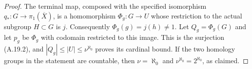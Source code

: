 \begin{proof}
The terminal map, composed with the specified isomorphism
$q_*:G\to\pi_1(\overline X)$, is a homomorphism
$\Phi_g:G\to U$ whose restriction to the actual subgroup
$H\subset G$ is $j$. Consequently
$\Phi_g(g)=j(h)\ne1$. Let $Q_g=\Phi_g(G)$ and let
$p_g$ be $\Phi_g$ with codomain restricted to this image.
This is the surjection (A.19.2), and
$|Q_g|\leq|U|\leq\nu^{\aleph_0}$ proves its cardinal
bound. If the two homology groups in the statement are
countable, then $\nu=\aleph_0$ and
$\nu^{\aleph_0}=2^{\aleph_0}$, as claimed.
\end{proof}
